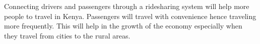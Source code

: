 Connecting drivers and passengers through a ridesharing system will help more people to travel in Kenya. Passengers will travel with convenience hence traveling more frequently. This will help in the growth of the economy especially when they travel from cities to the rural areas.